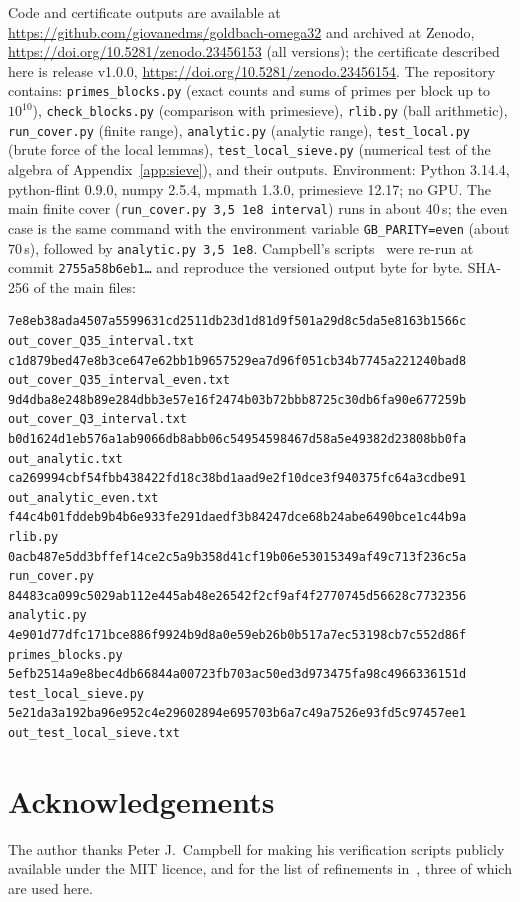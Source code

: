 \documentclass[preprint,11pt]{elsarticle}
\theoremstyle{definition}
\theoremstyle{remark}
\numberwithin{equation}{section}
\begin{document}
\begin{sloppypar}
Code and certificate outputs are available at
\url{https://github.com/giovanedms/goldbach-omega32} and archived at Zenodo,
\url{https://doi.org/10.5281/zenodo.23456153} (all versions); the certificate
described here is release v1.0.0, \url{https://doi.org/10.5281/zenodo.23456154}. The repository
contains: \texttt{primes\_blocks.py} (exact counts
and sums of primes per block up to $10^{10}$), \texttt{check\_blocks.py}
(comparison with primesieve), \texttt{rlib.py} (ball arithmetic),
\texttt{run\_cover.py} (finite range), \texttt{analytic.py} (analytic
range), \texttt{test\_local.py} (brute force of the local lemmas),
\texttt{test\_local\_sieve.py} (numerical test of the algebra of Appendix~\ref{app:sieve}), and
their outputs. Environment: Python 3.14.4, python-flint 0.9.0, numpy 2.5.4,
mpmath 1.3.0, primesieve 12.17; no GPU. The main finite cover
(\texttt{run\_cover.py 3,5 1e8 interval}) runs in about $40$\,s; the even
case is the same command with the environment variable
\texttt{GB\_PARITY=even} (about $70$\,s), followed by
\texttt{analytic.py 3,5 1e8}.
Campbell's scripts~\cite{CampbellRepo} were re-run at commit
\texttt{2755a58b6eb1\ldots} and reproduce the versioned output byte for
byte. SHA-256 of the main files:
\end{sloppypar}

\begingroup\fontsize{7}{8.5}\selectfont
\begin{verbatim}
7e8eb38ada4507a5599631cd2511db23d1d81d9f501a29d8c5da5e8163b1566c  out_cover_Q35_interval.txt
c1d879bed47e8b3ce647e62bb1b9657529ea7d96f051cb34b7745a221240bad8  out_cover_Q35_interval_even.txt
9d4dba8e248b89e284dbb3e57e16f2474b03b72bbb8725c30db6fa90e677259b  out_cover_Q3_interval.txt
b0d1624d1eb576a1ab9066db8abb06c54954598467d58a5e49382d23808bb0fa  out_analytic.txt
ca269994cbf54fbb438422fd18c38bd1aad9e2f10dce3f940375fc64a3cdbe91  out_analytic_even.txt
f44c4b01fddeb9b4b6e933fe291daedf3b84247dce68b24abe6490bce1c44b9a  rlib.py
0acb487e5dd3bffef14ce2c5a9b358d41cf19b06e53015349af49c713f236c5a  run_cover.py
84483ca099c5029ab112e445ab48e26542f2cf9af4f2770745d56628c7732356  analytic.py
4e901d77dfc171bce886f9924b9d8a0e59eb26b0b517a7ec53198cb7c552d86f  primes_blocks.py
5efb2514a9e8bec4db66844a00723fb703ac50ed3d973475fa98c4966336151d  test_local_sieve.py
5e21da3a192ba96e952c4e29602894e695703b6a7c49a7526e93fd5c97457ee1  out_test_local_sieve.txt
\end{verbatim}
\endgroup

\section*{Acknowledgements}
The author thanks Peter J.\ Campbell for making his verification scripts
publicly available under the MIT licence, and for the list of refinements
in~\cite[\S6]{Campbell2026}, three of which are used here.
\end{document}
